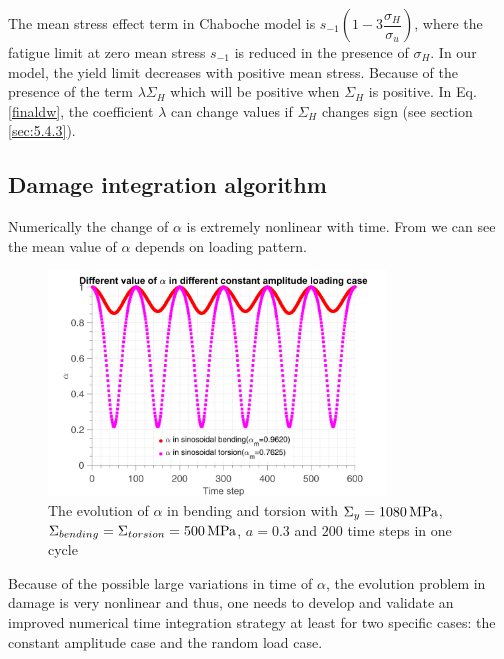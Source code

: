 The mean stress effect term in Chaboche model is $s_{-1}\left(1-3\dfrac{\sigma_H}{\sigma_u} \right)$, where the fatigue limit at zero mean stress $s_{-1}$ is reduced in the presence of $\sigma_H$. In our model, the yield limit decreases with positive mean stress. Because of the presence of the term $\lambda \Sigma_H$ which will be positive when $\Sigma_H$ is positive. In Eq.\eqref{finaldw}, the coefficient $\lambda$ can change values if $\Sigma_H$ changes sign (see section \ref{sec:5.4.3}).


\subsection{Damage integration algorithm}

Numerically the  change of $\alpha$ is extremely nonlinear with time. From  we can see the mean value of $\alpha$ depends on loading pattern. 

\begin{figure}[!h]
	\centering
	\includegraphics[width=0.8\textwidth]{figures//alp_mean_methods.png} 
	\caption{The evolution of $\alpha$ in bending and torsion with $\Sigma_y=1080 \,\textnormal{MPa}$, $\Sigma_{bending}=\Sigma_{torsion}=500 \,\textnormal{MPa}$, $a=0.3$ and $200$ time steps in one cycle}
	\label{fig.alpmean}
\end{figure}


Because of the possible large variations in time  of $\alpha$, the evolution problem in damage is very nonlinear and thus, one needs to develop and validate an improved numerical time integration strategy at least  for two specific cases: the constant amplitude case and the random load case.

